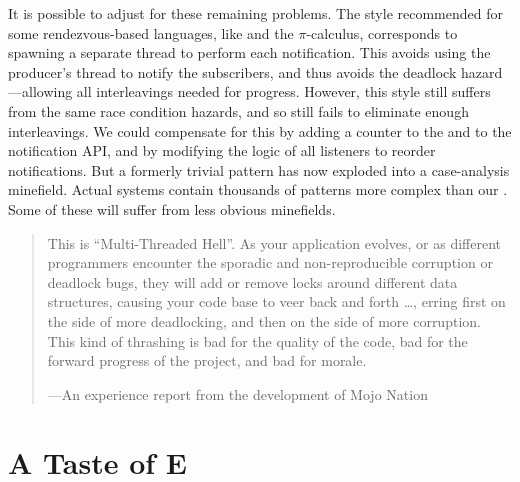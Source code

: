 \documentclass{llncs}
\begin{document}
It is possible to adjust for these remaining problems. The style
recommended for some rendezvous-based languages, like  and the $\pi$-calculus, corresponds to spawning a separate thread
to perform each notification.  This avoids using the producer's thread
to notify the subscribers, and thus avoids the deadlock
hazard---allowing all interleavings needed for progress. However, this
style still suffers from the same race condition hazards, and so still
fails to eliminate enough interleavings. We could compensate for this
by adding a counter to the  and to the notification
API, and by modifying the logic of all listeners to reorder
notifications. But a formerly trivial pattern has now exploded into a
case-analysis minefield. Actual systems contain thousands of patterns
more complex than our . Some of these will suffer
from less obvious minefields.
%
\begin{quotation}
This is ``Multi-Threaded Hell''. As your application evolves, or as
different programmers encounter the sporadic and non-reproducible
corruption or deadlock bugs, they will add or remove locks around
different data structures, causing your code base to veer back and
forth \ldots, erring first on the side of more deadlocking, and then
on the side of more corruption. This kind of thrashing is bad for the
quality of the code, bad for the forward progress of the project, and
bad for morale.
\begin{flushright}
---An experience report from the development of Mojo Nation \cite{zooko:hell}
\end{flushright}
\end{quotation}

\section{A Taste of E}
\end{document}
